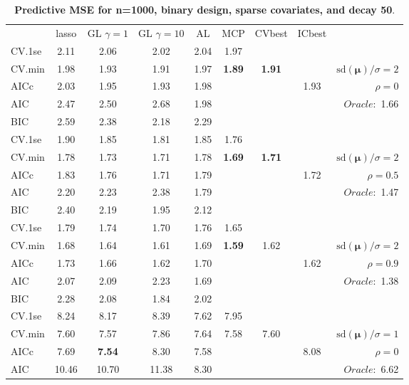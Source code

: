 \clearpage
\begin{table}\vspace{-.5cm}
\caption[l]{ { \bf Predictive MSE for n=1000, binary design, 
sparse covariates, and  decay  50}.}
\vspace{-.5cm}
\footnotesize{}
\begin{center}
\begin{tabular}{l*{7}{c}|r}
 & lasso & GL $\gamma=1$ & GL $\gamma=10$ & AL & MCP  & CVbest & ICbest  \\
\cline{1-9}
CV.1se & 2.11 & 2.06 & 2.02 & 2.04 & 1.97 & & & \\
CV.min & 1.98 & 1.93 & 1.91 & 1.97 & {\bf 1.89} & {\bf 1.91} & & $\mathrm{sd}(\mathbf{\mu})/\sigma=2$ \\
AICc & 2.03 & 1.95 & 1.93 & 1.98 & & & 1.93 &  $\rho=0$ \\
AIC & 2.47 & 2.50 & 2.68 & 1.98 & & & &  \multirow{2}{*}{$Oracle: $ 1.66} \\
BIC & 2.59 & 2.38 & 2.18 & 2.29 & & & &  \\
 \hline 
CV.1se & 1.90 & 1.85 & 1.81 & 1.85 & 1.76 & & & \\
CV.min & 1.78 & 1.73 & 1.71 & 1.78 & {\bf 1.69} & {\bf 1.71} & & $\mathrm{sd}(\mathbf{\mu})/\sigma=2$ \\
AICc & 1.83 & 1.76 & 1.71 & 1.79 & & & 1.72 &  $\rho=0.5$ \\
AIC & 2.20 & 2.23 & 2.38 & 1.79 & & & &  \multirow{2}{*}{$Oracle: $ 1.47} \\
BIC & 2.40 & 2.19 & 1.95 & 2.12 & & & &  \\
 \hline 
CV.1se & 1.79 & 1.74 & 1.70 & 1.76 & 1.65 & & & \\
CV.min & 1.68 & 1.64 & 1.61 & 1.69 & {\bf 1.59} & 1.62 & & $\mathrm{sd}(\mathbf{\mu})/\sigma=2$ \\
AICc & 1.73 & 1.66 & 1.62 & 1.70 & & & 1.62 &  $\rho=0.9$ \\
AIC & 2.07 & 2.09 & 2.23 & 1.69 & & & &  \multirow{2}{*}{$Oracle: $ 1.38} \\
BIC & 2.28 & 2.08 & 1.84 & 2.02 & & & &  \\
 \hline 
CV.1se & 8.24 & 8.17 & 8.39 & 7.62 & 7.95 & & & \\
CV.min & 7.60 & 7.57 & 7.86 & 7.64 & 7.58 & 7.60 & & $\mathrm{sd}(\mathbf{\mu})/\sigma=1$ \\
AICc & 7.69 & {\bf 7.54} & 8.30 & 7.58 & & & 8.08 &  $\rho=0$ \\
AIC & 10.46 & 10.70 & 11.38 & 8.30 & & & &  \multirow{2}{*}{$Oracle: $ 6.62} \\

\end{tabular}
\end{center}
\end{table}
